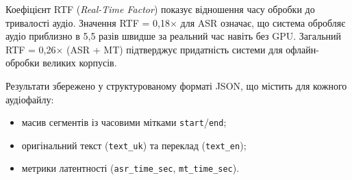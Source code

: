 Коефіцієнт RTF (\textit{Real-Time Factor}) показує відношення часу обробки
до тривалості аудіо. Значення RTF = 0,18$\times$ для ASR означає, що система
обробляє аудіо приблизно в 5,5 разів швидше за реальний час навіть без GPU.
Загальний RTF = 0,26$\times$ (ASR + MT) підтверджує придатність системи
для офлайн-обробки великих корпусів.

Результати збережено у структурованому форматі JSON, що містить для кожного
аудіофайлу:
\begin{itemize}
    \item масив сегментів із часовими мітками \texttt{start}/\texttt{end};
    \item оригінальний текст (\texttt{text\_uk}) та переклад (\texttt{text\_en});
    \item метрики латентності (\texttt{asr\_time\_sec}, \texttt{mt\_time\_sec}).
\end{itemize}





\clearpage
